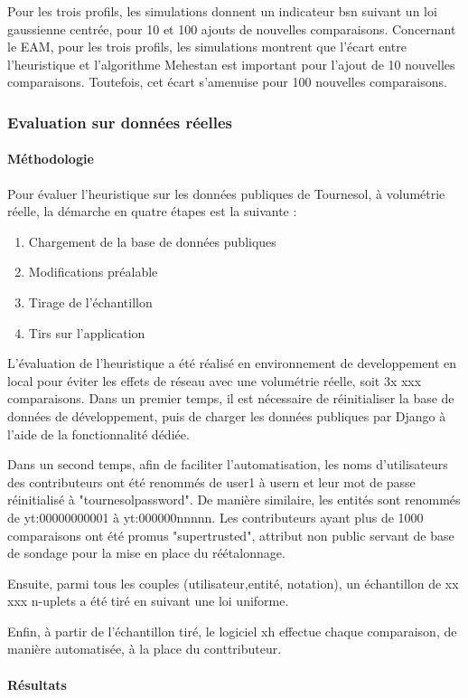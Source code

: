 Pour les trois profils, les simulations donnent un indicateur \gls{bsn} suivant un loi gaussienne centrée, pour 10 et 100 ajouts de nouvelles comparaisons.
Concernant le \gls{EAM}, pour les trois profils, les simulations montrent que l'écart entre l'heuristique et l'algorithme Mehestan est important pour l'ajout de 10 nouvelles comparaisons. Toutefois, cet écart s'amenuise pour 100 nouvelles comparaisons.


\subsubsection{Evaluation sur données réelles}


\paragraph{Méthodologie}

Pour évaluer l'heuristique sur les données publiques de Tournesol, à volumétrie réelle, la démarche en quatre étapes est la suivante :

\begin{enumerate}
    \item Chargement de la base de données publiques
    \item Modifications préalable
    \item Tirage de l'échantillon
    \item Tirs sur l'application
\end{enumerate}
L'évaluation de l'heuristique a été réalisé en environnement de developpement en local pour éviter les effets de réseau avec une volumétrie réelle, soit 3x xxx comparaisons.
Dans un premier temps, il est nécessaire de réinitialiser la base de données de développement, puis de charger les données publiques par Django à l'aide de la fonctionnalité dédiée.

Dans un second temps, afin de faciliter l'automatisation, les noms d'utilisateurs des contributeurs ont été renommés de user1 à usern et leur mot de passe réinitialisé à "tournesolpassword". De manière similaire, les entités sont renommés de yt:00000000001 à yt:000000nnnnn. Les contributeurs ayant plus de 1000 comparaisons ont été promus "supertrusted", attribut non public servant de base de sondage pour la mise en place du réétalonnage.

Ensuite, parmi tous les couples (utilisateur,entité, notation), un échantillon de xx xxx n-uplets a été tiré en suivant une loi uniforme.

Enfin, à partir de l'échantillon tiré, le logiciel xh effectue chaque comparaison, de manière automatisée, à la place du conttributeur.


\paragraph{Résultats}

\pagebreak